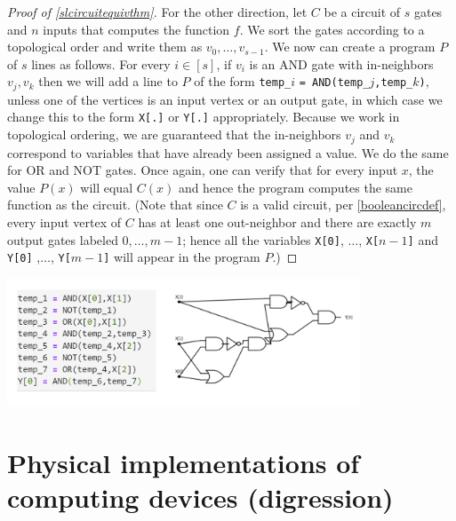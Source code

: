 \begin{proof}[Proof of \cref{slcircuitequivthm}]
For the other direction, let \(C\) be a circuit of \(s\) gates and \(n\)
inputs that computes the function \(f\). We sort the gates according to
a topological order and write them as \(v_0,\ldots,v_{s-1}\). We now can
create a program \(P\) of \(s\) lines as follows. For every
\(i\in [s]\), if \(v_i\) is an AND gate with in-neighbors \(v_j,v_k\)
then we will add a line to \(P\) of the form \texttt{temp\_}\(i\)
\texttt{= AND(temp\_}\(j\)\texttt{,temp\_}\(k\)\texttt{)}, unless one of
the vertices is an input vertex or an output gate, in which case we
change this to the form \texttt{X[.]} or \texttt{Y[.]} appropriately.
Because we work in topological ordering, we are guaranteed that the
in-neighbors \(v_j\) and \(v_k\) correspond to variables that have
already been assigned a value. We do the same for OR and NOT gates. Once
again, one can verify that for every input \(x\), the value \(P(x)\)
will equal \(C(x)\) and hence the program computes the same function as
the circuit. (Note that since \(C\) is a valid circuit, per
\cref{booleancircdef}, every input vertex of \(C\) has at least one
out-neighbor and there are exactly \(m\) output gates labeled
\(0,\ldots,m-1\); hence all the variables \texttt{X[0]}, \(\ldots\),
\texttt{X[}\(n-1\)\texttt{]} and \texttt{Y[0]} ,\(\ldots\),
\texttt{Y[}\(m-1\)\texttt{]} will appear in the program \(P\).)

\end{proof}


\begin{marginfigure}
\centering
\includegraphics[width=\linewidth, height=1.5in, keepaspectratio]{../figure/aoncircequiv.png}
\caption{Two equivalent descriptions of the same AND/OR/NOT computation
as both an AON program and a Boolean circuit.}
\label{aoncircequivfig}
\end{marginfigure}

\section{Physical implementations of computing devices
(digression)}\label{physicalimplementationsec}

